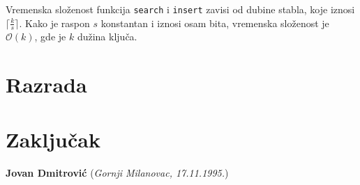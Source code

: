\documentclass[12pt,oneside]{memoir}
\begin{document}
Vremenska složenost funkcija \texttt{search} i \texttt{insert}
zavisi od dubine stabla, koje iznosi
$ \lceil \frac{k}{s} \rceil $. Kako je raspon $s$ konstantan i
iznosi osam bita, vremenska složenost je
$ \mathcal{O}(k) $, gde je $k$ dužina ključa.

\chapter{Razrada}
\label{chp:razrada}

\chapter{Zaključak}

\literatura

\backmatter

\begin{biografija}
  \textbf{Jovan Dmitrović} (\emph{Gornji Milanovac, 17.11.1995.})
\end{biografija}
\end{document}
